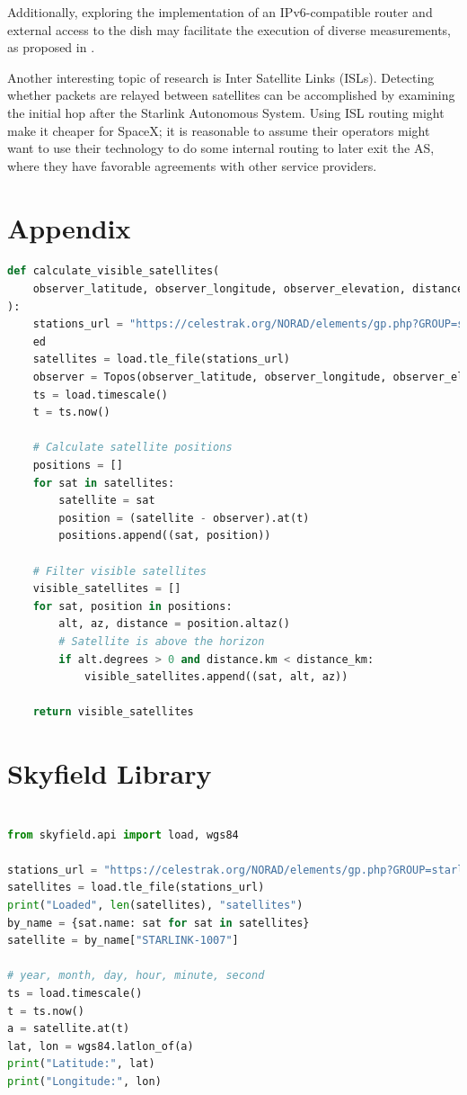 \documentclass[IN,11pt,twoside,openright,idp,english]{tumthesis}
\begin{document}
Additionally, exploring the implementation of an IPv6-compatible router and external access to the dish may facilitate the execution of diverse measurements, as proposed in \cite{izhikevich2023democratizing}.

Another interesting topic of research is Inter Satellite Links (ISLs). Detecting whether packets are relayed between satellites can be accomplished by examining the initial hop after the Starlink Autonomous System. Using ISL routing might make it cheaper for SpaceX; it is reasonable to assume their operators might want to use their technology to do some internal routing to later exit the AS, where they have favorable agreements with other service providers.

\appendix
\chapter{Appendix}

\begin{lstlisting}[language=python,caption={the \texttt{calculate\_visible\_satellites} function},captionpos=b]
def calculate_visible_satellites(
    observer_latitude, observer_longitude, observer_elevation, distance_km
):
    stations_url = "https://celestrak.org/NORAD/elements/gp.php?GROUP=starlink&FORMAT=tle"
    ed
    satellites = load.tle_file(stations_url)
    observer = Topos(observer_latitude, observer_longitude, observer_elevation)
    ts = load.timescale()
    t = ts.now()

    # Calculate satellite positions
    positions = []
    for sat in satellites:
        satellite = sat
        position = (satellite - observer).at(t)
        positions.append((sat, position))

    # Filter visible satellites
    visible_satellites = []
    for sat, position in positions:
        alt, az, distance = position.altaz()
        # Satellite is above the horizon
        if alt.degrees > 0 and distance.km < distance_km:
            visible_satellites.append((sat, alt, az))

    return visible_satellites
\end{lstlisting}

\chapter{Skyfield Library}
\label{app:sky}

\begin{lstlisting}[language=python,caption={retrieving a Satellite's position using the Satname},captionpos=b]

from skyfield.api import load, wgs84

stations_url = "https://celestrak.org/NORAD/elements/gp.php?GROUP=starlink&FORMAT=tle"
satellites = load.tle_file(stations_url)
print("Loaded", len(satellites), "satellites")
by_name = {sat.name: sat for sat in satellites}
satellite = by_name["STARLINK-1007"]

# year, month, day, hour, minute, second
ts = load.timescale()
t = ts.now()
a = satellite.at(t)
lat, lon = wgs84.latlon_of(a)
print("Latitude:", lat)
print("Longitude:", lon)
\end{lstlisting}

\clearpage
\pagestyle{thesischapter}
\cleardoublepage
{}
\printbibliography[heading=bibintoc]
\clearpage
\pagestyle{empty}
\end{document}
